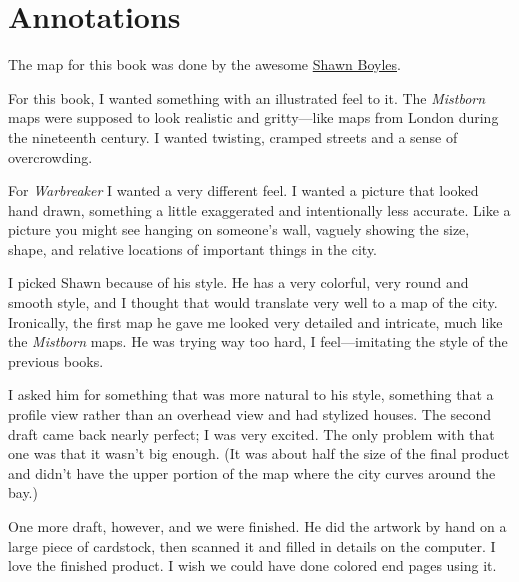\section*{Annotations}

The map for this book was done by the awesome \href{https://spikethesurfdog.blogspot.com}{Shawn Boyles}.

For this book, I wanted something with an illustrated feel to it. The \textit{Mistborn} maps were supposed to look realistic and gritty---like maps from London during the nineteenth century. I wanted twisting, cramped streets and a sense of overcrowding.

For \textit{Warbreaker} I wanted a very different feel. I wanted a picture that looked hand drawn, something a little exaggerated and intentionally less accurate. Like a picture you might see hanging on someone's wall, vaguely showing the size, shape, and relative locations of important things in the city.

I picked Shawn because of his style. He has a very colorful, very round and smooth style, and I thought that would translate very well to a map of the city. Ironically, the first map he gave me looked very detailed and intricate, much like the \textit{Mistborn} maps. He was trying way too hard, I feel---imitating the style of the previous books.

I asked him for something that was more natural to his style, something that a profile view rather than an overhead view and had stylized houses. The second draft came back nearly perfect; I was very excited. The only problem with that one was that it wasn't big enough. (It was about half the size of the final product and didn't have the upper portion of the map where the city curves around the bay.)

One more draft, however, and we were finished. He did the artwork by hand on a large piece of cardstock, then scanned it and filled in details on the computer. I love the finished product. I wish we could have done colored end pages using it.
